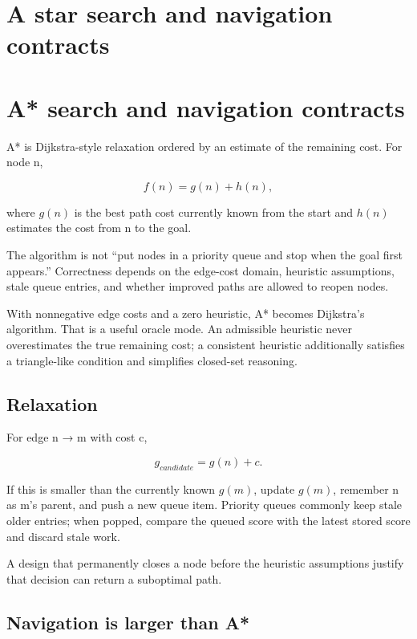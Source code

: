 \hypertarget{appendix-5803241aa1a5}{}
\section*{A star search and navigation contracts}
\section{A* search and navigation contracts}\label{appendix-5803241aa1a5-a-search-and-navigation-contracts}

A* is Dijkstra-style relaxation ordered by an estimate of the remaining cost. For node n,

\[
f(n)=g(n)+h(n),
\]

where \(g(n)\) is the best path cost currently known from the start and \(h(n)\) estimates the cost from n to the goal.

The algorithm is not ``put nodes in a priority queue and stop when the goal first appears.'' Correctness depends on the edge-cost domain, heuristic assumptions, stale queue entries, and whether improved paths are allowed to reopen nodes.

With nonnegative edge costs and a zero heuristic, A* becomes Dijkstra's algorithm. That is a useful oracle mode. An admissible heuristic never overestimates the true remaining cost; a consistent heuristic additionally satisfies a triangle-like condition and simplifies closed-set reasoning.

\subsection{Relaxation}\label{appendix-5803241aa1a5-relaxation}

For edge n → m with cost c,

\[
g_{candidate}=g(n)+c.
\]

If this is smaller than the currently known \(g(m)\), update \(g(m)\), remember n as m's parent, and push a new queue item. Priority queues commonly keep stale older entries; when popped, compare the queued score with the latest stored score and discard stale work.

A design that permanently closes a node before the heuristic assumptions justify that decision can return a suboptimal path.

\subsection{Navigation is larger than A*}\label{appendix-5803241aa1a5-navigation-is-larger-than-a}

